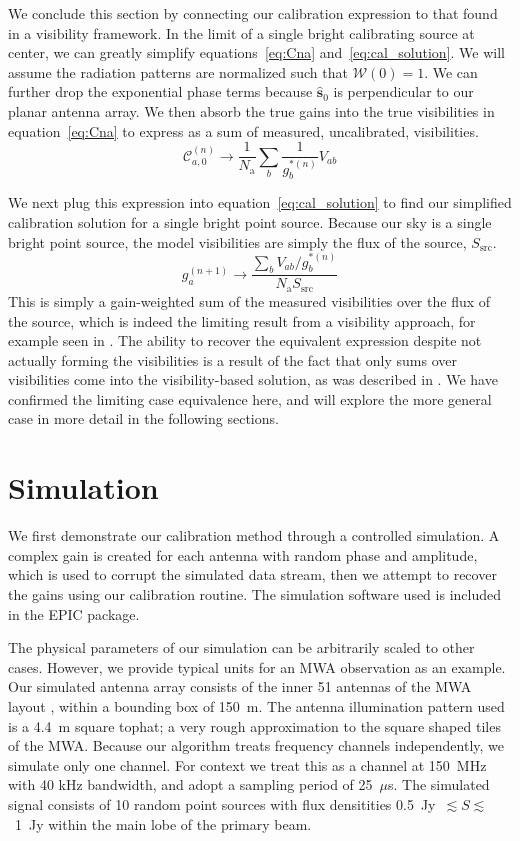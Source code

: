 \documentclass[a4paper,fleqn,usenatbib]{mnras}
\newcommand{\Nant}{\ensuremath{N_{\mathrm{a}}}}
\newcommand{\spix}{\ensuremath{\hat{\mathbf{s}}_{0}}}
\begin{document}
We conclude this section by connecting our calibration expression to that found in a visibility 
framework. In the limit of a single bright calibrating source at center, we can greatly 
simplify equations~\ref{eq:Cna} and~\ref{eq:cal_solution}. We will assume the radiation patterns are 
normalized such that $\mathcal{W}(0)=1$. We can further drop the exponential phase terms 
because $\spix$ is perpendicular to our planar antenna array. We then absorb the true gains into the true visibilities in 
equation~\ref{eq:Cna} to express as a sum of measured, uncalibrated, visibilities.
\begin{equation}
\mathcal{C}^{(n)}_{a,0} \rightarrow \frac{1}{\Nant}\sum_b \frac{1}{g^{*(n)}_b} V_{ab}
\end{equation}

We next plug this expression into equation~\ref{eq:cal_solution} to find our simplified 
calibration solution for a single bright point source. Because our sky is a single bright point 
source, the model visibilities are simply the flux of the source, $S_{\mathrm{src}}$.
\begin{equation}
g^{(n+1)}_a \rightarrow \frac{\sum_b  V_{ab}/g^{*(n)}_b}{\Nant S_{\mathrm{src}}}
\end{equation}
This is simply a gain-weighted sum of the measured visibilities over the flux of the source, 
which is indeed the limiting result from a visibility approach, for example seen in \citealt{mit08}. 
The ability to recover the equivalent expression despite not actually forming the visibilities is a 
result of the fact that only sums over visibilities come into the visibility-based solution, as was described in 
\citealt{mor11}. We have confirmed the limiting case equivalence here, and will explore the 
more general case in more detail in the following sections.

\section{Simulation}\label{sec:sim}
We first demonstrate our calibration method through a controlled simulation. A complex gain is 
created for each antenna with random phase and amplitude, which is used to corrupt the 
simulated data stream, then we attempt to recover the gains using our calibration routine. The 
simulation software used is included in the EPIC package.

The physical parameters of our simulation can be arbitrarily scaled to other cases. However, 
we provide typical units for an MWA observation as an example. Our simulated antenna 
array consists of the inner 51 antennas of the MWA layout \citep{bea12}, within a bounding 
box of 150~m. The antenna illumination pattern used is a 4.4~m square tophat; a very rough 
approximation to the square shaped tiles of the MWA. Because our algorithm treats frequency 
channels independently, we simulate only one channel. For context we treat this as a channel
at 150~MHz with 40 kHz bandwidth, and adopt a sampling period of 25~$\mu$s. The simulated signal 
consists of 10 random point sources with flux densitities 0.5~Jy~$\lesssim S \lesssim$~1~Jy 
within the main lobe of the primary beam.
\end{document}
